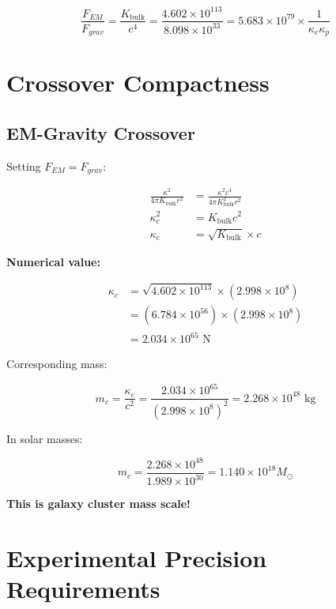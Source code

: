 \documentclass{article}
\begin{document}
\begin{equation}
\frac{F_{EM}}{F_{grav}} = \frac{K_{\text{bulk}}}{c^4} = \frac{4.602 \times 10^{113}}{8.098 \times 10^{33}} = 5.683 \times 10^{79} \times \frac{1}{\kappa_e \kappa_p}
\end{equation}

\section{Crossover Compactness}

\subsection{EM-Gravity Crossover}

Setting $F_{EM} = F_{grav}$:

\begin{align}
\frac{\kappa^2}{4\pi K_{\text{bulk}} r^2} &= \frac{\kappa^2 c^4}{4\pi K_{\text{bulk}}^2 r^2} \\
\kappa_c^2 &= K_{\text{bulk}} c^2 \\
\kappa_c &= \sqrt{K_{\text{bulk}}} \times c
\end{align}

\textbf{Numerical value:}

\begin{align}
\kappa_c &= \sqrt{4.602 \times 10^{113}} \times (2.998 \times 10^8) \\
&= (6.784 \times 10^{56}) \times (2.998 \times 10^8) \\
&= 2.034 \times 10^{65} \text{ N}
\end{align}

Corresponding mass:

\begin{equation}
m_c = \frac{\kappa_c}{c^2} = \frac{2.034 \times 10^{65}}{(2.998 \times 10^8)^2} = 2.268 \times 10^{48} \text{ kg}
\end{equation}

In solar masses:

\begin{equation}
m_c = \frac{2.268 \times 10^{48}}{1.989 \times 10^{30}} = 1.140 \times 10^{18} M_\odot
\end{equation}

\textbf{This is galaxy cluster mass scale!}

\section{Experimental Precision Requirements}
\end{document}
